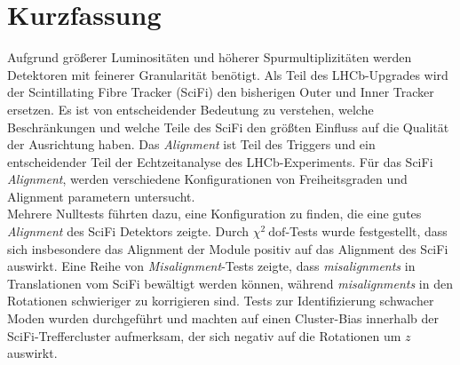 \chapter*{Kurzfassung}
\label{sec:kurzf}

Aufgrund größerer Luminositäten und höherer Spurmultiplizitäten werden Detektoren mit feinerer Granularität benötigt.
Als Teil des LHCb-Upgrades wird der Scintillating Fibre Tracker (SciFi) den bisherigen Outer und Inner Tracker ersetzen. Es ist von entscheidender Bedeutung zu verstehen, welche Beschränkungen und welche Teile des SciFi den größten Einfluss auf die Qualität der Ausrichtung haben.
Das \textit{Alignment} ist Teil des Triggers und ein entscheidender Teil der Echtzeitanalyse des LHCb-Experiments.
Für das SciFi \textit{Alignment}, werden verschiedene Konfigurationen von Freiheitsgraden und Alignment parametern untersucht.
\\
Mehrere Nulltests führten dazu, eine Konfiguration zu finden, die eine gutes \textit{Alignment} des SciFi Detektors zeigte.
Durch $\chi^2 \ \text{dof}$-Tests wurde festgestellt, dass sich insbesondere das Alignment der Module positiv auf das Alignment des SciFi auswirkt.
Eine Reihe von \textit{Misalignment}-Tests zeigte, dass \textit{misalignments} in Translationen vom SciFi bewältigt werden können, während \textit{misalignments} in den Rotationen schwieriger zu korrigieren sind.
Tests zur Identifizierung schwacher Moden wurden durchgeführt und machten auf einen Cluster-Bias innerhalb der SciFi-Treffercluster aufmerksam, der sich negativ auf die Rotationen um $z$ auswirkt.

